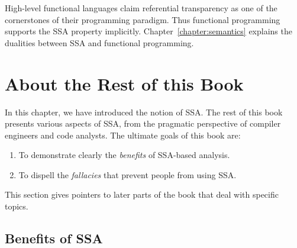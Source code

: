 High-level functional languages claim
referential transparency as one of the
cornerstones of their programming paradigm.
Thus functional programming supports the SSA property
implicitly.
Chapter~\ref{chapter:semantics} explains the 
dualities between SSA and functional programming.





\section{About the Rest of this Book}

In this chapter, we have introduced the notion of SSA.
The rest of this book presents various aspects of SSA,
from the pragmatic perspective of compiler engineers and
code analysts. The ultimate goals of this book are:
\begin{enumerate}
\item To demonstrate clearly the \emph{benefits} of SSA-based analysis.
\item To dispell the \emph{fallacies} that prevent people from using SSA.
\end{enumerate}
This section gives pointers to later parts of the book that deal with
specific topics.


\subsection{Benefits of SSA}
\vspace{-1mm}

